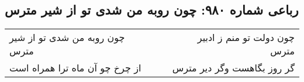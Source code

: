 \begin{center}
\section*{رباعی شماره ۹۸۰: چون روبه من شدی تو از شیر مترس}
\label{sec:0980}
\begin{longtable}{l p{0.5cm} r}
چون روبه من شدی تو از شیر مترس
&&
چون دولت تو منم ز ادبیر مترس
\\
از چرخ چو آن ماه ترا همراه است
&&
گر روز بگاهست وگر دیر مترس
\\
\end{longtable}
\end{center}
